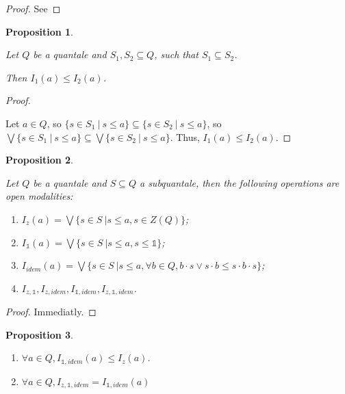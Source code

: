 \documentclass[a4paper]{article}
\newtheorem{prop}{Proposition}
\begin{document}
\begin{proof}
  See
\end{proof}

\begin{prop}
$ $

  Let $Q$ be a quantale and $S_1, S_2 \subseteq Q$, such that $S_1 \subseteq S_2$.

  Then $I_1 (a) \leq I_2 (a)$.
\end{prop}

\begin{proof}
$ $

  Let $a \in Q$, so $\{ s \in S_1 \: | \: s \leq a \} \subseteq \{ s \in S_2 \: | \: s \leq a \}$, so
  $\bigvee \{ s \in S_1 \: | \: s \leq a \} \subseteq \bigvee \{ s \in S_2 \: | \: s \leq a \}$.
  Thus, $I_1 (a) \leq I_2 (a)$.
\end{proof}

\begin{prop}
$ $

Let $Q$ be a quantale and $S \subseteq Q$ a subquantale, then the following operations are open modalities:

\begin{enumerate}
  \item $I_z (a) = \bigvee \{ s \in S \: | s \leq a, s \in Z(Q) \}$;
  \item $I_{\mathds{1}} (a) = \bigvee \{ s \in S \: | s \leq a, s \leq \mathds{1} \}$;
  \item $I_{idem} (a) = \bigvee \{ s \in S \: | s \leq a, \forall b \in Q, b \cdot s \vee s \cdot b \leq s \cdot b \cdot s\}$;
  \item $I_{z, \mathds{1}}, I_{z, idem}, I_{\mathds{1}, idem}, I_{z, \mathds{1}, idem}$.
\end{enumerate}
\end{prop}

\begin{proof}
  Immediatly.
\end{proof}

\begin{prop}
$ $

\begin{enumerate}
  \item $\forall a \in Q, I_{\mathds{1}, idem}(a) \leq I_z (a)$.
  \item $\forall a \in Q, I_{z, \mathds{1}, idem} = I_{\mathds{1}, idem}(a)$
\end{enumerate}

\end{prop}
\end{document}
